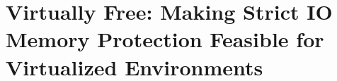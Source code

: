 \section{Virtually Free: Making Strict IO Memory Protection Feasible for Virtualized Environments}
\label{chp:viommu}

\graphicspath{{vFree/}}

\newcommand{\vfreename}{vFree}
\newcommand{\vfreebrand}{vFree }
\newcommand{\optOne}{one-for-many invalidation}
\newcommand{\optOneHeading}{One-for-many Invalidation}
\newcommand{\CodeIn}[1]{{\small\texttt{#1}}}
\providecommand{\Description}[1]{}
\newcommand*\BC[1]{\begin{tikzpicture}[baseline=(C.base)]%
    \node[draw,circle,fill=black,inner sep=0.1pt](C){\textcolor{white}{#1}};%
    \end{tikzpicture}}














